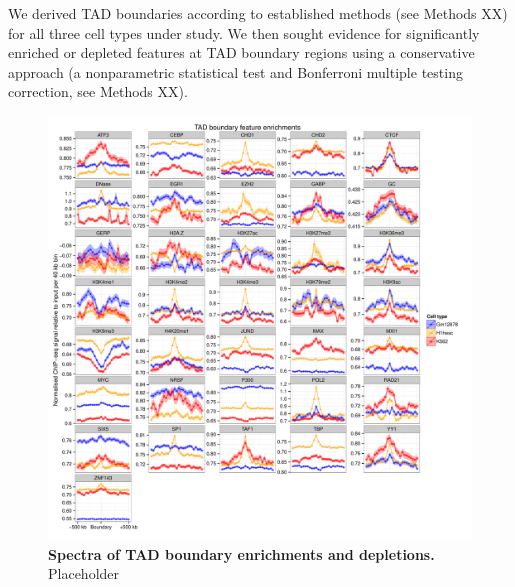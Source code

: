 \documentclass[a4paper,10pt,oneside]{book}
\begin{document}
We derived TAD boundaries according to established methods (see Methods XX) for all three cell types under study. We then sought evidence for significantly enriched or depleted features at TAD boundary regions using a conservative approach (a nonparametric statistical test and Bonferroni multiple testing correction, see Methods XX).

\begin{figure}
\begin{center} 
\includegraphics[width=1.12\textwidth]{figs/alltads.pdf}
\captionsetup{width=\textwidth}
\caption{ {\bf Spectra of TAD boundary enrichments and depletions.}
Placeholder
}\label{fig:alltads}
\end{center}
\end{figure} 
\end{document}
